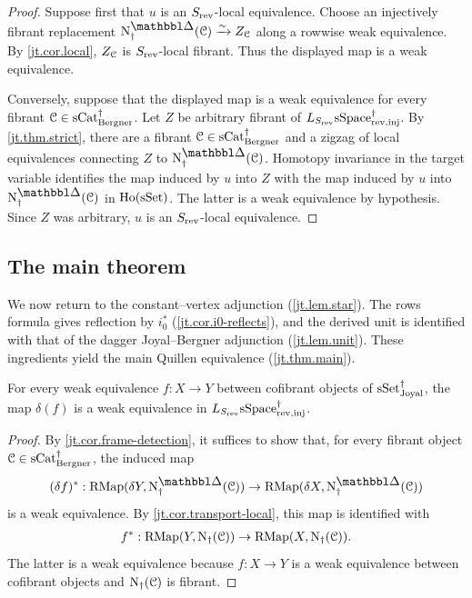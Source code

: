 \documentclass[a4paper,dvipdfmx,11pt]{amsart}
\begin{document}
\begin{proof}
  Suppose first that $u$ is an $S_{\mathrm{rev}}$-local equivalence.
  Choose an injectively fibrant replacement $\N^{\prism}_{\dag}(\calC) \xrightarrow{\sim} Z_{\calC}$ along a rowwise weak equivalence.
  By \cref{jt.cor.local}, $Z_{\mathcal{C}}$ is $S_{\mathrm{rev}}$-local fibrant.
  Thus the displayed map is a weak equivalence.

  Conversely, suppose that the displayed map is a weak equivalence for every fibrant $\mathcal{C}\in\mathrm{sCat}^{\dag}_{\mathrm{Bergner}}$.
  Let $Z$ be arbitrary fibrant of $L_{S_{\mathrm{rev}}}\mathrm{sSpace}^{\dag}_{\mathrm{rev},\mathrm{inj}}$.
  By \cref{jt.thm.strict}, there are a fibrant $\mathcal{C}\in\mathrm{sCat}^{\dag}_{\mathrm{Bergner}}$ and a zigzag of local equivalences connecting $Z$ to $\N^{\prism}_{\dag}(\calC)$.
  Homotopy invariance in the target variable identifies the map induced by $u$ into $Z$ with the map induced by $u$ into $\N^{\prism}_{\dag}(\calC)$ in $\mathrm{Ho}(\mathrm{sSet})$.
  The latter is a weak equivalence by hypothesis.
  Since $Z$ was arbitrary, $u$ is an $S_{\mathrm{rev}}$-local equivalence.
\end{proof}

\subsection{The main theorem}

We now return to the constant--vertex adjunction (\cref{jt.lem.star}).
The rows formula gives reflection by $i_0^{*}$ (\cref{jt.cor.i0-reflects}), and the derived unit is identified with that of the dagger Joyal--Bergner adjunction (\cref{jt.lem.unit}).
These ingredients yield the main Quillen equivalence (\cref{jt.thm.main}).

\begin{lemma}\label{jt.lem.delta-local}
  For every weak equivalence $f:X\to Y$ between cofibrant objects of $\mathrm{sSet}^{\dag}_{\mathrm{Joyal}}$, the map $\delta(f)$ is a weak equivalence in $L_{S_{\mathrm{rev}}}\mathrm{sSpace}^{\dag}_{\mathrm{rev},\mathrm{inj}}$.
\end{lemma}

\begin{proof}
  By \cref{jt.cor.frame-detection}, it suffices to show that, for every fibrant object $\mathcal{C}\in\mathrm{sCat}^{\dag}_{\mathrm{Bergner}}$, the induced map
  \begin{align}
    (\delta f)^{*} : 
    \RMap(\delta Y,\N^{\prism}_{\dag}(\calC))
    \to 
    \RMap(\delta X,\N^{\prism}_{\dag}(\calC))
  \end{align}
  is a weak equivalence.
  By \cref{jt.cor.transport-local}, this map is identified with
  \begin{align}
    f^{*} : 
    \mathrm{RMap}(Y,\mathrm{N}_{\dag}(\mathcal{C}))
    \to 
    \mathrm{RMap}(X,\mathrm{N}_{\dag}(\mathcal{C})).
  \end{align}
  The latter is a weak equivalence because $f:X\to Y$ is a weak equivalence between cofibrant objects and $\mathrm{N}_{\dag}(\mathcal{C})$ is fibrant.
\end{proof}
\end{document}

